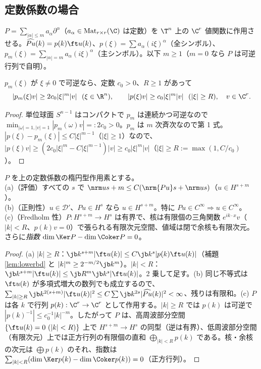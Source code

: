 \subsection{定数係数の場合}
$P=\sum_{|\alpha|\le m}a_\alpha\partial^\alpha$（$a_\alpha\in\mathrm{Mat}_{r\times r}(\C)$ は定数）を $\T^n$ 上の $\C^r$ 値関数に作用させる。$\widehat{Pu}(k)=p(k)\ft u(k)$、$p(\xi)=\sum a_\alpha(i\xi)^\alpha$（全シンボル）、$p_m(\xi)=\sum_{|\alpha|=m}a_\alpha(i\xi)^\alpha$（主シンボル）。以下 $m\ge1$（$m=0$ なら $P$ は可逆行列で自明）。
\begin{lem}\label{lem:lowerbd}\tP
$p_m(\xi)$ が $\xi\ne0$ で可逆なら、定数 $c_0>0$、$R\ge1$ があって
\[
|p_m(\xi)v|\ge2c_0|\xi|^m|v|\ \ (\xi\in\R^n),\qquad|p(\xi)v|\ge c_0|\xi|^m|v|\ \ (|\xi|\ge R),\quad v\in\C^r.
\]
\end{lem}
\begin{proof}
単位球面 $S^{n-1}$ はコンパクトで $p_m$ は連続かつ可逆なので $\min_{|\omega|=1,|v|=1}|p_m(\omega)v|=:2c_0>0$。$p_m$ は $m$ 次斉次なので第 1 式。$|p(\xi)-p_m(\xi)|\le C|\xi|^{m-1}$（$|\xi|\ge1$）なので、$|p(\xi)v|\ge(2c_0|\xi|^m-C|\xi|^{m-1})|v|\ge c_0|\xi|^m|v|$（$|\xi|\ge R:=\max(1,C/c_0)$）。
\end{proof}
\begin{thm}[定数係数楕円型作用素]\label{thm:constell}\tP
$P$ を上の定数係数の楕円型作用素とする。\\
(a)（評価）すべての $s$ で $\nrm u{s+m}\le C(\nrm{Pu}s+\nrm us)$（$u\in H^{s+m}$）。\\
(b)（正則性）$u\in\mathcal D'$、$Pu\in H^s$ なら $u\in H^{s+m}$。特に $Pu\in C^\infty\Rightarrow u\in C^\infty$。\\
(c)（Fredholm 性）$P:H^{s+m}\to H^s$ は有界で、核は有限個の三角関数 $e^{ik\cdot x}v$（$|k|<R$、$p(k)v=0$）で張られる有限次元空間、値域は閉で余核も有限次元。さらに\emph{指数} $\dim\Ker P-\dim\Coker P=0$。
\end{thm}
\begin{proof}
(a) $|k|\ge R$：$\jb k^{s+m}|\ft u(k)|\le C\jb k^s|p(k)\ft u(k)|$（補題 \ref{lem:lowerbd} と $|k|^m\ge2^{-m/2}\jb k^m$）。$|k|<R$：$\jb k^{s+m}|\ft u(k)|\le\jb R^m\jb k^s|\ft u(k)|$。2 乗して足す。(b) 同じ不等式は $\ft u(k)$ が多項式増大の数列でも成立するので、$\sum_{|k|\ge R}\jb k^{2(s+m)}|\ft u(k)|^2\le C\sum\jb k^{2s}|\widehat{Pu}(k)|^2<\infty$、残りは有限和。(c) $P$ は各 $k$ で行列 $p(k):\C^r\to\C^r$ として作用する。$|k|\ge R$ では $p(k)$ は可逆で $|p(k)^{-1}|\le c_0^{-1}|k|^{-m}$。したがって $P$ は、高周波部分空間 $\{\ft u(k)=0\ (|k|<R)\}$ 上で $H^{s+m}\to H^s$ の同型（逆は有界）、低周波部分空間（有限次元）上では正方行列の有限個の直和 $\bigoplus_{|k|<R}p(k)$ である。核・余核の次元は $\bigoplus p(k)$ のそれ、指数は $\sum_{|k|<R}(\dim\Ker p(k)-\dim\Coker p(k))=0$（正方行列）。
\end{proof}

